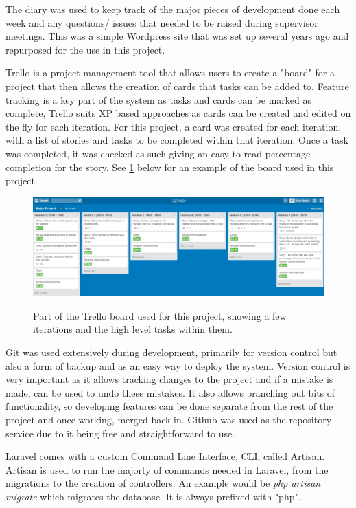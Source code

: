 The diary was used to keep track of the major pieces of development done each week and any questions/ issues that needed to be raised during supervisor meetings. This was a simple Wordpress site that was set up several years ago and repurposed for the use in this project.

Trello is a project management tool that allows users to create a "board" for a project that then allows the creation of cards that tasks can be added to\cite{trello}. Feature tracking is a key part of the system as tasks and cards can be marked as complete, Trello suits XP based approaches as cards can be created and edited on the fly for each iteration. For this project, a card was created for each iteration, with a list of stories and tasks to be completed within that iteration. Once a task was completed, it was checked as such giving an easy to read percentage completion for the story. See \ref{fig:trello-board} below for an example of the board used in this project.

\begin{figure}
	\caption{Part of the Trello board used for this project, showing a few iterations and the high level tasks within them.}
	\includegraphics[width=\textwidth]{Chapter2/trello-board}
	\label{fig:trello-board}
\end{figure}
\newpage

Git was used extensively during development, primarily for version control but also a form of backup and as an easy way to deploy the system. Version control is very important as it allows tracking changes to the project and if a mistake is made, can be used to undo these mistakes. It also allows branching out bits of functionality, so developing features can be done separate from the rest of the project and once working, merged back in. Github was used as the repository service due to it being free and straightforward to use\cite{github}.

Laravel comes with a custom Command Line Interface, CLI, called Artisan\cite{artisan}. Artisan is used to run the majorty of commands needed in Laravel, from the migrations to the creation of controllers. An example would be \textit{php artisan migrate} which migrates the database. It is always prefixed with "php".

